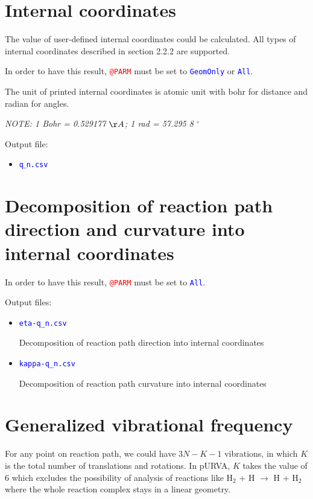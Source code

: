 \section{Internal coordinates}
The value of user-defined internal coordinates could be calculated. All types of internal coordinates described in section 2.2.2 are supported. 

In order to have this result, \texttt{\textcolor{red}{@PARM}} must be set to \texttt{\textcolor{blue}{GeomOnly}} or \texttt{\textcolor{blue}{All}}.

The unit of printed internal coordinates is atomic unit with bohr for distance and radian for angles.

\textit{NOTE: 1 Bohr = 0.529177 $\AA$; 1 rad = 57.295 8 $^{\circ}$ }


Output file:
\begin{itemize}
    \item \texttt{\textcolor{blue}{q$\_$n.csv}}
\end{itemize}






\section{Decomposition of reaction path direction and curvature into internal coordinates}


In order to have this result, \texttt{\textcolor{red}{@PARM}} must be set to  \texttt{\textcolor{blue}{All}}.

Output files:
\begin{itemize}
    \item \texttt{\textcolor{blue}{eta-q\_n.csv}}
    
    Decomposition of reaction path direction into internal coordinates
    
    \item \texttt{\textcolor{blue}{kappa-q\_n.csv}}
    
    Decomposition of reaction path curvature into internal coordinates
    
\end{itemize}


\section{Generalized vibrational frequency}
For any point on reaction path, we could have $3N - K - 1$ vibrations, in which $K$ is the total number of translations and rotations. In pURVA, $K$ takes the value of 6 which excludes the possibility of analysis of reactions like H$_2$ + H $\rightarrow$ H + H$_2$ where the whole reaction complex stays in a linear geometry.

